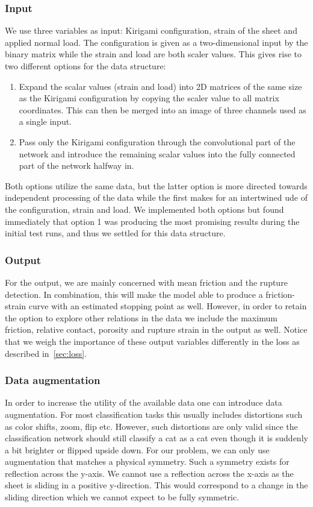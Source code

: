 \subsubsection{Input}
We use three variables as input: Kirigami configuration, strain of the sheet
and applied normal load. The configuration is given as a two-dimensional input by the binary matrix while the strain and load are both scaler values. This gives rise to two different options for the data structure:
\begin{enumerate}
  \item Expand the scalar values (strain and load) into 2D matrices of the same
  size as the Kirigami configuration by copying the scaler value to all matrix coordinates. This can then be merged into an image of three channels used as a single input.  
  \item Pass only the Kirigami configuration through the convolutional part of the network and introduce the remaining scalar values into the fully connected part of the network halfway in. 
\end{enumerate}
Both options utilize the same data, but the latter option is more directed towards independent processing of the data while the first makes for an intertwined ude of the configuration, strain and load. We implemented both options but found immediately that option 1 was producing the most promising results during the initial test runs, and thus we settled for this data structure. 

\subsubsection{Output}
For the output, we are mainly concerned with mean friction and the rupture
detection. In combination, this will make the model able to produce a friction-strain curve with an estimated stopping point as well. However, in order to retain the option to explore other relations in the data we include the maximum friction, relative contact, porosity and rupture strain in the output as well. Notice that we weigh the importance of these output variables differently in the loss as described in~\cref{sec:loss}. 


\subsubsection{Data augmentation}
In order to increase the utility of the available data one can introduce data augmentation. For most classification tasks this usually includes distortions such as color shifts, zoom, flip etc. However, such distortions are only valid since the classification network should still classify a cat as a cat even though it is suddenly a bit brighter or flipped upside down. For our problem, we can only use augmentation that matches a physical symmetry. Such a symmetry exists for reflection across the y-axis. We cannot use a reflection across the
x-axis as the sheet is sliding in a positive y-direction. This would correspond to a change in the sliding direction which we cannot expect to be fully symmetric. 


